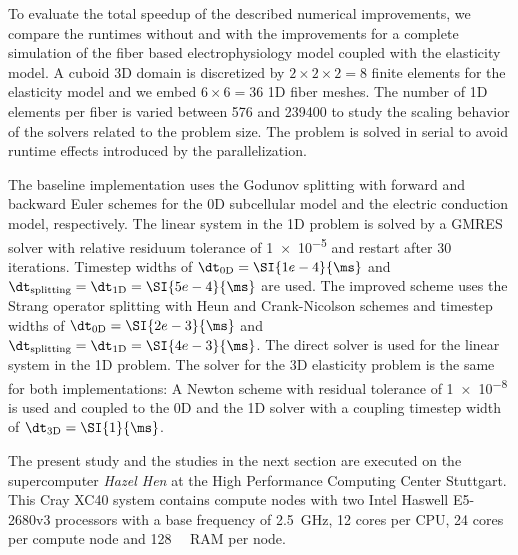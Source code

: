 To evaluate the total speedup of the described numerical improvements, we compare the runtimes without and with the improvements for a complete simulation of the fiber based electrophysiology model coupled with the elasticity model. A cuboid 3D domain is discretized by $2\times 2\times 2=8$ finite elements for the elasticity model and we embed $6\times 6=36$ 1D fiber meshes. The number of 1D elements per fiber is varied between 576 and \num{239400} to study the scaling behavior of the solvers related to the problem size. The problem is solved in serial to avoid runtime effects introduced by the parallelization.

The baseline implementation uses the Godunov splitting with forward and backward Euler schemes for the 0D subcellular model and the electric conduction model, respectively. The linear system in the 1D problem is solved by a GMRES solver with relative residuum tolerance of \num{1e-5} and restart after 30 iterations. Timestep widths of $\dt_\text{0D}=\SI{1e-4}{\ms}$ and $\dt_\text{splitting}=\dt_\text{1D}=\SI{5e-4}{\ms}$ are used. The improved scheme uses the Strang operator splitting with Heun and Crank-Nicolson schemes and timestep widths of $\dt_\text{0D}=\SI{2e-3}{\ms}$ and $\dt_\text{splitting}=\dt_\text{1D} = \SI{4e-3}{\ms}$. The direct solver is used for the linear system in the 1D problem.
The solver for the 3D elasticity problem is the same for both implementations: A Newton scheme with residual tolerance of \num{1e-8} is used
 and coupled to the 0D and the 1D solver with a coupling timestep width of $\dt_\text{3D}=\SI{1}{\ms}$.

The present study and the studies in the next section are executed on the supercomputer \emph{Hazel Hen} at the High Performance Computing Center Stuttgart. This Cray XC40 system contains compute nodes with two Intel Haswell E5-2680v3 processors with a base frequency of \SI{2.5}{\giga\hertz}, 12 cores per CPU, 24 cores per compute node and \SI{128}{\giga\byte} RAM per node.

